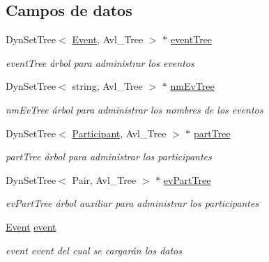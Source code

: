 \subsection*{Campos de datos}
\begin{DoxyCompactItemize}
\item 
Dyn\+Set\+Tree$<$ \hyperlink{class_event}{Event}, Avl\+\_\+\+Tree $>$ $\ast$ \hyperlink{class_reg_part_window_a47d9b536b8ba3b49f143856fb47d3342}{event\+Tree}\hypertarget{class_reg_part_window_a47d9b536b8ba3b49f143856fb47d3342}{}\label{class_reg_part_window_a47d9b536b8ba3b49f143856fb47d3342}

\begin{DoxyCompactList}\small\item\em event\+Tree árbol para administrar los eventos \end{DoxyCompactList}\item 
Dyn\+Set\+Tree$<$ string, Avl\+\_\+\+Tree $>$ $\ast$ \hyperlink{class_reg_part_window_aa26133ca3263056494bb1df5356af77c}{nm\+Ev\+Tree}\hypertarget{class_reg_part_window_aa26133ca3263056494bb1df5356af77c}{}\label{class_reg_part_window_aa26133ca3263056494bb1df5356af77c}

\begin{DoxyCompactList}\small\item\em nm\+Ev\+Tree árbol para administrar los nombres de los eventos \end{DoxyCompactList}\item 
Dyn\+Set\+Tree$<$ \hyperlink{class_participant}{Participant}, Avl\+\_\+\+Tree $>$ $\ast$ \hyperlink{class_reg_part_window_a841c9497e5247f79f5e565ed127c8fe5}{part\+Tree}\hypertarget{class_reg_part_window_a841c9497e5247f79f5e565ed127c8fe5}{}\label{class_reg_part_window_a841c9497e5247f79f5e565ed127c8fe5}

\begin{DoxyCompactList}\small\item\em part\+Tree árbol para administrar los participantes \end{DoxyCompactList}\item 
Dyn\+Set\+Tree$<$ Pair, Avl\+\_\+\+Tree $>$ $\ast$ \hyperlink{class_reg_part_window_a069dafb9e42cc355e21b5e5860b54dd4}{ev\+Part\+Tree}\hypertarget{class_reg_part_window_a069dafb9e42cc355e21b5e5860b54dd4}{}\label{class_reg_part_window_a069dafb9e42cc355e21b5e5860b54dd4}

\begin{DoxyCompactList}\small\item\em ev\+Part\+Tree árbol auxiliar para administrar los participantes \end{DoxyCompactList}\item 
\hyperlink{class_event}{Event} \hyperlink{class_reg_part_window_a613f3532b18e98cb4b4bb81dda335b1a}{event}\hypertarget{class_reg_part_window_a613f3532b18e98cb4b4bb81dda335b1a}{}\label{class_reg_part_window_a613f3532b18e98cb4b4bb81dda335b1a}

\begin{DoxyCompactList}\small\item\em event event del cual se cargarán los datos \end{DoxyCompactList}\end{DoxyCompactItemize}


